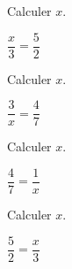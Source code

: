 \begin{multicols}{4}
    
    Calculer $x$.

    $\dfrac{x}{3}=\dfrac{5}{2}$

    
    Calculer $x$.

    $\dfrac{3}{x}=\dfrac{4}{7}$

    
    Calculer $x$.

    $\dfrac{4}{7}=\dfrac{1}{x}$

    
    Calculer $x$.

    $\dfrac{5}{2}=\dfrac{x}{3}$

\end{multicols}